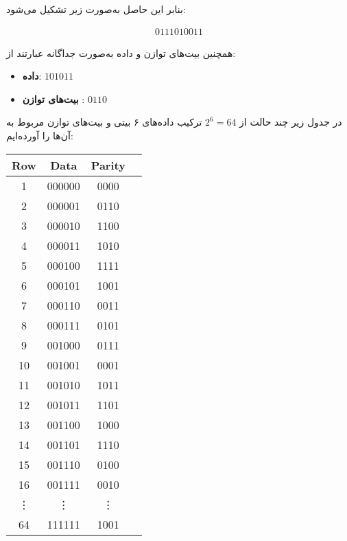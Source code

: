 \begin{qsolve}
	
	بنابر این  حاصل به‌صورت زیر تشکیل می‌شود:
	
	\begin{align*}
		0111010011
	\end{align*}
	
	
	 همچنین بیت‌های توازن و داده به‌صورت جداگانه عبارتند از:
	\begin{itemize}
		\item \textbf{داده}: \(101011\)
		\item \textbf{بیت‌های توازن }: \(0110\)
	\end{itemize}
	
	
	در جدول زیر چند حالت از \(2^6 = 64\) ترکیب داده‌های ۶ بیتی و بیت‌های توازن مربوط به آن‌ها را آورده‌ایم:
	
	\begin{latin}
		\begin{center}
		\begin{tabular}{|c|c|c|c|}
			\hline
			\textbf{Row} & \textbf{Data} & \textbf{Parity} \\
			\hline\hline
			1 & 000000 & 0000 \\
			2 & 000001 & 0110 \\
			3 & 000010 & 1100 \\
			4 & 000011 & 1010 \\
			5 & 000100 & 1111 \\
			6 & 000101 & 1001 \\
			7 & 000110 & 0011 \\
			8 & 000111 & 0101 \\
			9 & 001000 & 0111 \\
			10 & 001001 & 0001 \\
			11 & 001010 & 1011 \\
			12 & 001011 & 1101 \\
			13 & 001100 & 1000 \\
			14 & 001101 & 1110 \\
			15 & 001110 & 0100 \\
			16 & 001111 & 0010 \\
			\vdots & \vdots & \vdots \\
			64 & 111111 & 1001 \\
			\hline
		\end{tabular}
	\end{center}
	\end{latin}
	
	
	
\end{qsolve}



